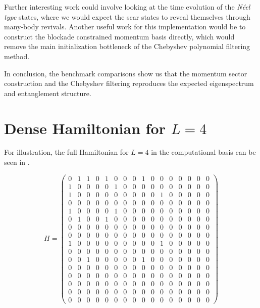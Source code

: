 \documentclass[%
 reprint,
 amsmath,amssymb,
 aps,
]{revtex4-2}
\begin{document}
Further interesting work could involve looking at the time evolution of the \textit{N\'eel type} states, where we would expect the scar states to reveal themselves through many-body revivals. Another useful work for this implementation would be to construct the blockade constrained momentum basis directly, which would remove the main initialization bottleneck of the Chebyshev polynomial filtering method.

In conclusion, the benchmark comparisons show us that the momentum sector construction and the Chebyshev filtering reproduces the expected eigenspectrum and entanglement structure.


\clearpage

\appendix

\section{Dense Hamiltonian for $L=4$}

For illustration, the full Hamiltonian for $L=4$ in the computational basis can be seen in .

\begin{equation}\label{eq:L4fullmatrix}
H =
\begin{pmatrix} 
0 & 1 & 1 & 0 & 1 & 0 & 0 & 0 & 1 & 0 & 0 & 0 & 0 & 0 & 0 & 0 \\
1 & 0 & 0 & 0 & 0 & 1 & 0 & 0 & 0 & 0 & 0 & 0 & 0 & 0 & 0 & 0 \\
1 & 0 & 0 & 0 & 0 & 0 & 0 & 0 & 0 & 0 & 1 & 0 & 0 & 0 & 0 & 0 \\
0 & 0 & 0 & 0 & 0 & 0 & 0 & 0 & 0 & 0 & 0 & 0 & 0 & 0 & 0 & 0 \\
1 & 0 & 0 & 0 & 0 & 1 & 0 & 0 & 0 & 0 & 0 & 0 & 0 & 0 & 0 & 0 \\
0 & 1 & 0 & 0 & 1 & 0 & 0 & 0 & 0 & 0 & 0 & 0 & 0 & 0 & 0 & 0 \\
0 & 0 & 0 & 0 & 0 & 0 & 0 & 0 & 0 & 0 & 0 & 0 & 0 & 0 & 0 & 0 \\
0 & 0 & 0 & 0 & 0 & 0 & 0 & 0 & 0 & 0 & 0 & 0 & 0 & 0 & 0 & 0 \\
1 & 0 & 0 & 0 & 0 & 0 & 0 & 0 & 0 & 0 & 1 & 0 & 0 & 0 & 0 & 0 \\
0 & 0 & 0 & 0 & 0 & 0 & 0 & 0 & 0 & 0 & 0 & 0 & 0 & 0 & 0 & 0 \\
0 & 0 & 1 & 0 & 0 & 0 & 0 & 0 & 1 & 0 & 0 & 0 & 0 & 0 & 0 & 0 \\
0 & 0 & 0 & 0 & 0 & 0 & 0 & 0 & 0 & 0 & 0 & 0 & 0 & 0 & 0 & 0 \\
0 & 0 & 0 & 0 & 0 & 0 & 0 & 0 & 0 & 0 & 0 & 0 & 0 & 0 & 0 & 0 \\
0 & 0 & 0 & 0 & 0 & 0 & 0 & 0 & 0 & 0 & 0 & 0 & 0 & 0 & 0 & 0 \\
0 & 0 & 0 & 0 & 0 & 0 & 0 & 0 & 0 & 0 & 0 & 0 & 0 & 0 & 0 & 0 \\
0 & 0 & 0 & 0 & 0 & 0 & 0 & 0 & 0 & 0 & 0 & 0 & 0 & 0 & 0 & 0
\end{pmatrix}
\end{equation}
\end{document}
